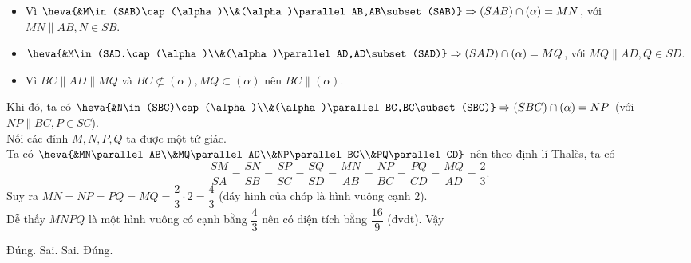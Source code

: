 \begin{ex}
{\begin{itemize}
   \item Vì $\heva{&M\in (SAB)\cap (\alpha)\\&(\alpha)\parallel AB,AB\subset (SAB)}\Rightarrow (SAB)\cap (\alpha)=MN$,  với $MN\parallel AB,N\in SB$.
   \item $\heva{&M\in (SAD.\cap (\alpha)\\&(\alpha)\parallel AD,AD\subset (SAD)}\Rightarrow (SAD)\cap (\alpha)=MQ$, với $MQ\parallel AD,Q\in  SD$.
   \item Vì $BC\parallel AD\parallel  MQ$ và $BC\not \subset (\alpha),MQ\subset (\alpha)$ nên $BC\parallel (\alpha)$.
  \end{itemize}
  Khi đó, ta có $\heva{&N\in (SBC)\cap (\alpha)\\&(\alpha)\parallel BC,BC\subset (SBC)}\Rightarrow  (SBC)\cap (\alpha)=NP$ (với $NP\parallel BC,P\in SC$).\\
  Nối  các đỉnh $M,N,P,Q$ ta được một tứ giác.\\
  Ta có $\heva{&MN\parallel AB\\&MQ\parallel AD\\&NP\parallel BC\\&PQ\parallel CD}$ nên theo định lí Thalès, ta  có
   \[\dfrac{SM}{SA}=\dfrac{SN}{SB}=\dfrac{SP}{SC}=\dfrac{SQ}{SD}=\dfrac{MN}{AB}=\dfrac{NP}{BC}=\dfrac{PQ}{CD}=\dfrac{MQ}{AD}=\dfrac{2}{3}.\]
  Suy ra $MN=NP=PQ=MQ=\dfrac{2}{3} \cdot 2=\dfrac{4}{3}$ (đáy  hình của chóp là hình vuông cạnh $2$).\\
  Dễ thấy $MNPQ$ là một hình  vuông có cạnh bằng $\dfrac{4}{3}$ nên có diện tích bằng $\dfrac{16}{9}$ (đvdt). Vậy
  \begin{itemchoice}
   \itemch  Đúng.
   \itemch  Sai.
    \itemch Sai.
   \itemch  Đúng.
  \end{itemchoice}
  }
\end{ex}

